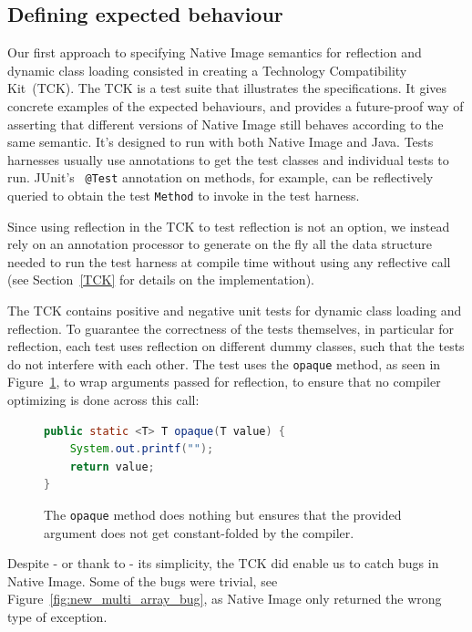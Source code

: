 \subsection{Defining expected behaviour}
Our first approach to specifying Native Image semantics for reflection and dynamic class loading consisted in creating a Technology Compatibility Kit~(TCK). The TCK is a test suite that illustrates the specifications. It gives concrete examples of the expected behaviours, and provides a future-proof way of asserting that different versions of Native Image still behaves according to the same semantic.
It's designed to run with both Native Image and Java.
Tests harnesses usually use annotations to get the test classes and individual tests to run. JUnit's~\cite{noauthor_junit_nodate} \verb|@Test| annotation on methods, for example, can be reflectively queried to obtain the test \verb|Method| to invoke in the test harness.

Since using reflection in the TCK to test reflection is not an option, we instead rely on an annotation processor to generate on the fly all the data structure needed to run the test harness at compile time without using any reflective call (see Section~\ref{TCK} for details on the implementation).

The TCK contains positive and negative unit tests for dynamic class loading and reflection. To guarantee the correctness of the tests themselves, in particular for reflection, each test uses reflection on different dummy classes, such that the tests do not interfere with each other.
The test uses the \verb|opaque| method, as seen in Figure~\ref{fig:opaque}, to wrap arguments passed for reflection, to ensure that no compiler optimizing is done across this call:
\begin{figure}[ht]
    \centering
\begin{lstlisting}[language=Java]
public static <T> T opaque(T value) {
    System.out.printf("");
    return value;
}
\end{lstlisting}
    \caption{The \texttt{opaque} method does nothing but ensures that the provided argument does not get constant-folded by the compiler.}
    \label{fig:opaque}
\end{figure}

Despite - or thank to - its simplicity, the TCK did enable us to catch bugs in Native Image.
Some of the bugs were trivial, see Figure~\ref{fig:new_multi_array_bug}, as Native Image only returned the wrong type of exception. 


